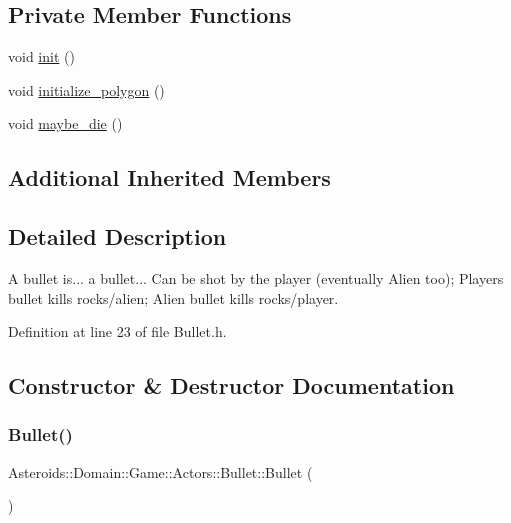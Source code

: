\subsection*{Private Member Functions}
\begin{DoxyCompactItemize}
\item 
void \hyperlink{classAsteroids_1_1Domain_1_1Game_1_1Actors_1_1Bullet_a1c7b384d298439c581d97f996f067985}{init} ()
\item 
void \hyperlink{classAsteroids_1_1Domain_1_1Game_1_1Actors_1_1Bullet_ae02bb0b6f3886f31ffdf1e51b1735035}{initialize\+\_\+polygon} ()
\item 
void \hyperlink{classAsteroids_1_1Domain_1_1Game_1_1Actors_1_1Bullet_aa5772b07856c5191c8ccdf5d0df568e8}{maybe\+\_\+die} ()
\end{DoxyCompactItemize}
\subsection*{Additional Inherited Members}


\subsection{Detailed Description}
A bullet is... a bullet... Can be shot by the player (eventually Alien too); Player\textquotesingle{}s bullet kills rocks/alien; Alien bullet kills rocks/player. 

Definition at line 23 of file Bullet.\+h.



\subsection{Constructor \& Destructor Documentation}
\mbox{\label{classAsteroids_1_1Domain_1_1Game_1_1Actors_1_1Bullet_a48557011de2d1939a8b5f7fe7e9fccda}} 
\subsubsection{\texorpdfstring{Bullet()}{Bullet()}}
{\footnotesize\ttfamily Asteroids\+::\+Domain\+::\+Game\+::\+Actors\+::\+Bullet\+::\+Bullet (\begin{DoxyParamCaption}{ }\end{DoxyParamCaption})}



